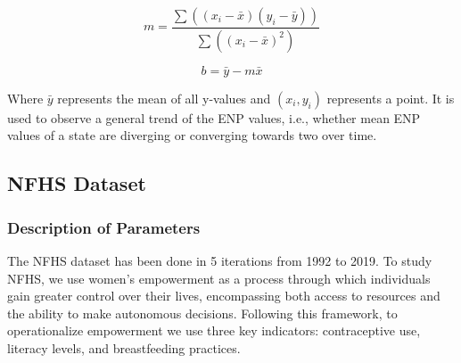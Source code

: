 \begin{equation}
m = \frac{\sum((x_i - \bar{x})(y_i - \bar{y}))}{\sum((x_i - \bar{x})^2)}
\end{equation}

\begin{equation}
b = \bar{y} - m\bar{x}
\end{equation}

Where $\bar{y}$ represents the mean of all y-values and $(x_i,y_i)$ represents a point. It is used to observe a general trend of the ENP values, i.e., whether mean ENP values of a state are diverging or converging towards two over time.

\subsection{NFHS Dataset}
\subsubsection{Description of Parameters}
The NFHS dataset has been done in 5 iterations from 1992 to 2019. To study NFHS, we use women's empowerment as a process through which individuals gain greater control over their lives, encompassing both access to resources and the ability to make autonomous decisions. Following this framework, to operationalize empowerment we use three key indicators: contraceptive use, literacy levels, and breastfeeding practices.

